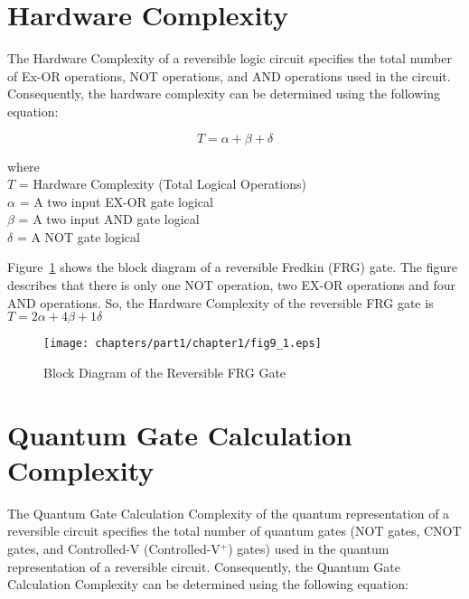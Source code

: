 
\section{Hardware Complexity}
The Hardware Complexity of a reversible logic circuit specifies the total number of Ex-OR operations, NOT operations, and AND operations used in the circuit. Consequently, the hardware complexity can be determined using the following equation:

\begin{equation}
T=\alpha+\beta+\delta
\end{equation}

\noindent where\\
$T$ = Hardware Complexity (Total Logical Operations)\\
$\alpha$ = A two input EX-OR gate logical  \\
$\beta$ = A two input AND gate logical  \\
$\delta$ = A NOT gate logical 

\begin{example}\textnormal{
Figure~\ref{fig:p1_c1_fig9_1} shows the block diagram of a reversible Fredkin (FRG) gate. The figure describes that there is only one NOT operation, two EX-OR operations and four AND operations. So, the Hardware Complexity of the reversible FRG gate is $T= 2\alpha+4\beta+1\delta$}
\end{example}
\begin{figure}[H]
\centering
\texttt{[image: chapters/part1/chapter1/fig9\_1.eps]}
\caption{Block Diagram of the Reversible FRG Gate}
\label{fig:p1_c1_fig9_1}
\end{figure}

\section{Quantum Gate Calculation Complexity}
The Quantum Gate Calculation Complexity of the quantum representation of a reversible circuit specifies the total number of quantum gates (NOT gates, CNOT gates, and Controlled-V (Controlled-V$^+$) gates) used in the quantum representation of a reversible circuit. Consequently, the Quantum Gate Calculation Complexity can be determined using the following equation:


